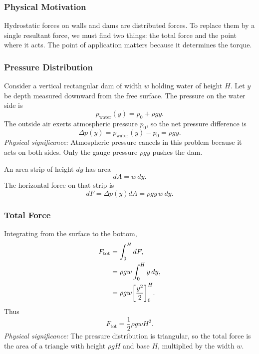 \documentclass[../main.tex]{subfiles}
\begin{document}
\subsubsection*{Physical Motivation}
Hydrostatic forces on walls and dams are distributed forces. To replace them by a single resultant force, we must find two things: the total force and the point where it acts. The point of application matters because it determines the torque.

\subsubsection{Pressure Distribution}\label{subsec:lec11:dam-pressure}
Consider a vertical rectangular dam of width $w$ holding water of height $H$. Let $y$ be depth measured downward from the free surface. The pressure on the water side is
\begin{equation}
  p_{\mathrm{water}}(y)=p_0+\rho g y.
  \label{eq:lec11_dam_water_pressure}
\end{equation}
The outside air exerts atmospheric pressure $p_0$, so the net pressure difference is
\begin{equation}
  \Delta p(y)=p_{\mathrm{water}}(y)-p_0=\rho g y.
  \label{eq:lec11_dam_net_pressure}
\end{equation}
\textit{Physical significance:} Atmospheric pressure cancels in this problem because it acts on both sides. Only the gauge pressure $\rho gy$ pushes the dam.

An area strip of height $dy$ has area
\begin{equation}
  dA=w\,dy.
  \label{eq:lec11_dam_strip_area}
\end{equation}
The horizontal force on that strip is
\begin{equation}
  dF=\Delta p(y)dA=\rho g y\,w\,dy.
  \label{eq:lec11_dam_differential_force}
\end{equation}

\subsubsection{Total Force}\label{subsec:lec11:dam-total-force}
Integrating from the surface to the bottom,
\begin{align}
  F_{\mathrm{tot}}
  &=\int_0^H dF,
  \label{eq:lec11_dam_force_int_1}\\
  &=\rho g w\int_0^H y\,dy,
  \label{eq:lec11_dam_force_int_2}\\
  &=\rho g w\qty[\frac{y^2}{2}]_0^H.
  \label{eq:lec11_dam_force_int_3}
\end{align}
Thus
\begin{equation}
  \boxed{F_{\mathrm{tot}}=\frac{1}{2}\rho g wH^2.}
  \label{eq:lec11_dam_total_force}
\end{equation}
\textit{Physical significance:} The pressure distribution is triangular, so the total force is the area of a triangle with height $\rho gH$ and base $H$, multiplied by the width $w$.
\end{document}
